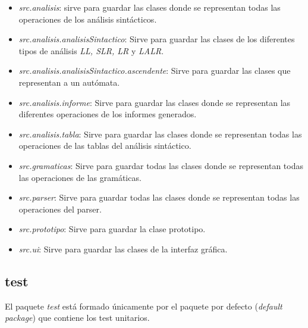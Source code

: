 \begin{itemize}
\item \textit{src.analisis}: sirve para guardar las clases donde se representan todas las operaciones de los análisis sintácticos.
\item \textit{src.analisis.analisisSintactico}: 
Sirve para guardar las clases de los diferentes tipos de análisis 
\textit{LL, SLR, LR} y \textit{LALR}.
\item \textit{src.analisis.analisisSintactico.ascendente}: 
Sirve para guardar las clases que representan a un autómata.
\item \textit{src.analisis.informe}: Sirve para guardar las clases donde se representan las diferentes operaciones de los informes generados.
\item \textit{src.analisis.tabla}: Sirve para guardar las clases donde se representan todas las operaciones de las tablas del análisis sintáctico.
\item \textit{src.gramaticas}: Sirve para guardar todas las clases donde se representan todas las operaciones de las gramáticas.
\item \textit{src.parser}: Sirve para guardar todas las clases donde se representan todas las operaciones del parser.
\item \textit{src.prototipo}: Sirve para guardar la clase prototipo.
\item \textit{src.ui}: Sirve para guardar las clases de la interfaz gráfica.

\end{itemize}

\subsection{test}

El paquete \textit{test} está formado únicamente por el paquete por defecto (\textit{default package}) que contiene los test unitarios.